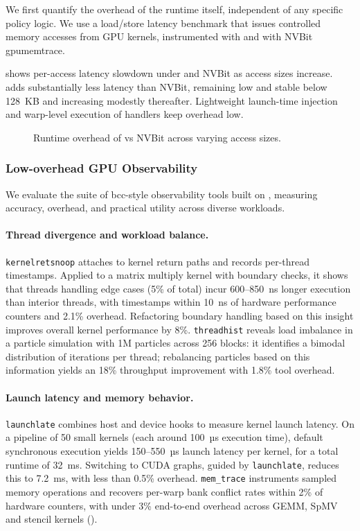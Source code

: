 We first quantify the overhead of the \sys runtime itself, independent of any
specific policy logic. We use a load/store latency benchmark that issues controlled memory accesses from GPU kernels, instrumented with \sys and with NVBit gpumemtrace.

 shows per-access latency slowdown under
\sys and NVBit as access sizes increase. \sys adds substantially less latency
than NVBit, remaining low and stable below 128~KB and increasing modestly
thereafter. Lightweight launch-time injection and warp-level execution of \sys handlers keep overhead low.

\begin{figure}
\centering
{}
\caption{Runtime overhead of \sys vs NVBit across varying access sizes.}
\label{fig:runtime-overhead}
\end{figure}

\subsubsection{Low-overhead GPU Observability}

We evaluate the suite of bcc-style observability tools built on \sys, measuring
accuracy, overhead, and practical utility across diverse workloads.

\paragraph{Thread divergence and workload balance.}
\texttt{kernelretsnoop} attaches to kernel return paths and records per-thread
timestamps. Applied to a matrix multiply kernel with boundary checks, it shows
that threads handling edge cases (5\% of total) incur 600--850~ns longer
execution than interior threads, with timestamps within 10~ns of hardware
performance counters and 2.1\% overhead. Refactoring boundary handling based on
this insight improves overall kernel performance by 8\%. \texttt{threadhist}
reveals load imbalance in a particle simulation with 1M particles across 256
blocks: it identifies a bimodal distribution of iterations per thread;
rebalancing particles based on this information yields an 18\% throughput
improvement with 1.8\% tool overhead.

\paragraph{Launch latency and memory behavior.}
\texttt{launchlate} combines host and device hooks to measure kernel launch
latency. On a pipeline of 50 small kernels (each around 100~µs execution time),
default synchronous execution yields 150--550~µs launch latency per kernel, for
a total runtime of 32~ms. Switching to CUDA graphs, guided by
\texttt{launchlate}, reduces this to 7.2~ms, with less than 0.5\% overhead.
\texttt{mem\_trace} instruments sampled memory operations and recovers per-warp
bank conflict rates within 2\% of hardware counters, with under 3\% end-to-end
overhead across GEMM, SpMV and stencil kernels ().

